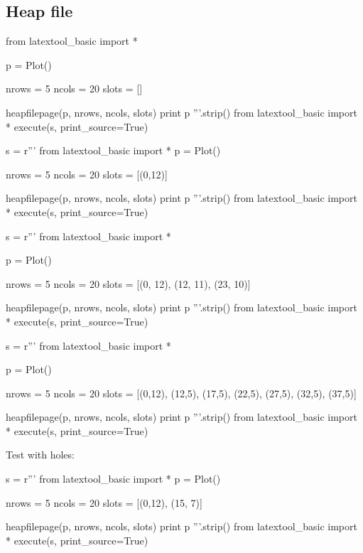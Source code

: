 \subsection{Heap file}

\begin{python}
from latextool_basic import *

p = Plot()

nrows = 5
ncols = 20
slots = []

heapfilepage(p, nrows, ncols, slots)
print p
'''.strip()
from latextool_basic import *
execute(s, print_source=True)
\end{python}

\begin{python}
s = r'''
from latextool_basic import *
p = Plot()

nrows = 5
ncols = 20
slots = [(0,12)]

heapfilepage(p, nrows, ncols, slots)
print p
'''.strip()
from latextool_basic import *
execute(s, print_source=True)
\end{python}


\begin{python}
s = r'''
from latextool_basic import *

p = Plot()

nrows = 5
ncols = 20
slots = [(0, 12), (12, 11), (23, 10)]

heapfilepage(p, nrows, ncols, slots)
print p
'''.strip()
from latextool_basic import *
execute(s, print_source=True)
\end{python}

\begin{python}
s = r'''
from latextool_basic import *

p = Plot()

nrows = 5
ncols = 20
slots = [(0,12), (12,5), (17,5), (22,5), (27,5), (32,5), (37,5)]

heapfilepage(p, nrows, ncols, slots)
print p
'''.strip()
from latextool_basic import *
execute(s, print_source=True)
\end{python}



\newpage
Test with holes:
\begin{python}
s = r'''
from latextool_basic import *
p = Plot()

nrows = 5
ncols = 20
slots = [(0,12), (15, 7)]

heapfilepage(p, nrows, ncols, slots)
print p
'''.strip()
from latextool_basic import *
execute(s, print_source=True)
\end{python}




